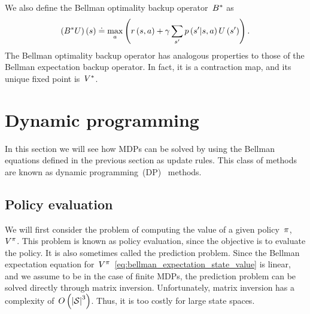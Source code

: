 We also define the Bellman optimality backup operator~${B^{*}}$ as
\begin{equation}
	\left(\bellmanoperator\optimal\valuevector\right)\left(\state\right)\doteq\max_{\action}\left(\immediatereward\left(\state,\action\right)+\discount\sum_{\state'}\transition\left(\state'\middle\vert\state,\action\right)\valuevector\left(\state'\right)\right).
\end{equation}
The Bellman optimality backup operator has analogous properties to those of the Bellman expectation backup operator. In fact, it is a contraction map, and its unique fixed point is~${V^{*}}$.

\section{Dynamic programming} \label{sec:dp}
In this section we will see how MDPs can be solved by using the Bellman equations defined in the previous section as update rules. This class of methods are known as dynamic programming~(DP)~{\cite{bellman1957dynamic}} methods.

\subsection{Policy evaluation}
We will first consider the problem of computing the value of a given policy~${\pi}$,~${V^{\pi}}$. This problem is known as policy evaluation, since the objective is to evaluate the policy. It is also sometimes called the prediction problem. Since the Bellman expectation equation for~${V^{\pi}}$~\eqref{eq:bellman_expectation_state_value} is linear, and we assume to be in the case of finite MDPs, the prediction problem can be solved directly through matrix inversion. Unfortunately, matrix inversion has a complexity of~${O\left(\left\lvert\mathcal{S}\right\rvert^{3}\right)}$. Thus, it is too costly for large state spaces.

